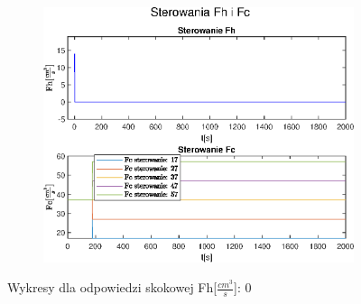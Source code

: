 \begin{figure}[h!]
   \begin{subfigure}[b]{0.6\textwidth}
      \includegraphics[width=1\linewidth]{img/step-responses/stepResponseU0.eps}
      \caption{}
      \label{fig:fig:stepResponsesFh03}
   \end{subfigure}
       
   \caption{Wykresy dla odpowiedzi skokowej Fh[$\frac{cm^3}{s}$]: 0}
   \label{fig:stepResponsesFh0}
\end{figure}
           
